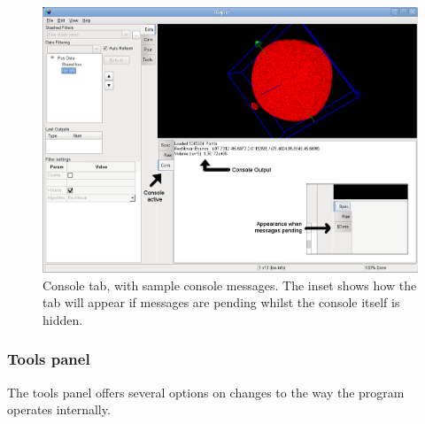 \documentclass[10pt]{article}
\begin{document}
\begin{figure}[ht]
\centering
 \includegraphics[width=0.85 \textwidth,keepaspectratio=true]{./figures/console.png}

 \caption{Console tab, with sample console messages. The inset shows how the tab will appear if messages are pending whilst the console itself is hidden.}
\label{fig:console-basics}
\end{figure}


\subsubsection{Tools panel}
The tools panel offers several options on changes to the way the program operates internally. 
\end{document}

